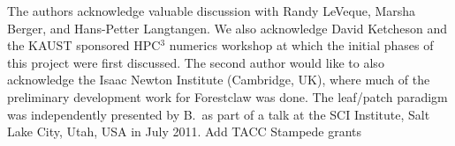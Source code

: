 \documentclass{IOS-Book-Article}     %
\newcommand{\forestclaw}{Forestclaw\xspace}
\newcommand{\alert}[1]{{\color{red}#1}}
\begin{document}
The authors acknowledge valuable discussion with Randy LeVeque, Marsha
Berger, and Hans-Petter Langtangen.  We also acknowledge David
Ketcheson and the KAUST sponsored HPC$^3$ numerics workshop at which
the initial phases of this project were first discussed.  The second
author would like to also acknowledge the Isaac Newton Institute
(Cambridge, UK), where much of the preliminary development work for
\forestclaw was done. The leaf/patch paradigm was independently
presented by B.\ as part of a talk at the SCI Institute, Salt Lake City, Utah,
USA in July 2011.
\alert{Add TACC Stampede grants}




\end{document}
